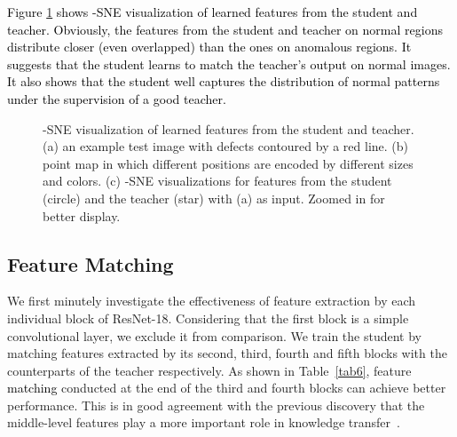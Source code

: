 \documentclass{bmvc2k}
\newcommand{\wgd}[1]{\textcolor{black}{{}#1}}
\begin{document}
\wgd{Figure \ref{fig:feature} shows -SNE visualization \cite{van2008visualizing} of learned features from the student and teacher. Obviously, the features from the student and teacher on normal regions distribute closer (even overlapped) than the ones on anomalous regions. It suggests that the student learns to match the teacher's output on normal images. It also shows that the student well captures the distribution of normal patterns under the supervision of a good teacher.}


\begin{figure}
	\centering
	\caption{-SNE visualization \cite{van2008visualizing} of learned features from the student and teacher. (a) an example test image with defects contoured by a red line. (b) point map in which different positions are encoded by different sizes and colors. (c) -SNE visualizations for features from the student (circle) and the teacher (star) with (a) as input. Zoomed in for better display.}
	\label{fig:feature}
\end{figure}


\subsection{Feature Matching}
\label{sec5-sub1}

We first minutely investigate the effectiveness of feature extraction by each individual block of ResNet-18. Considering that the first block is a simple convolutional layer, we exclude it from comparison. We train the student by matching features extracted by its second, third, fourth and fifth blocks with the counterparts of the teacher respectively. As shown in Table~\ref{tab6}, feature \wgd{matching} conducted at the end of the third and fourth blocks can achieve better performance. This is in good agreement with the previous discovery that the middle-level features play a more important role in knowledge transfer~\cite{Oquab2014}.
\end{document}
